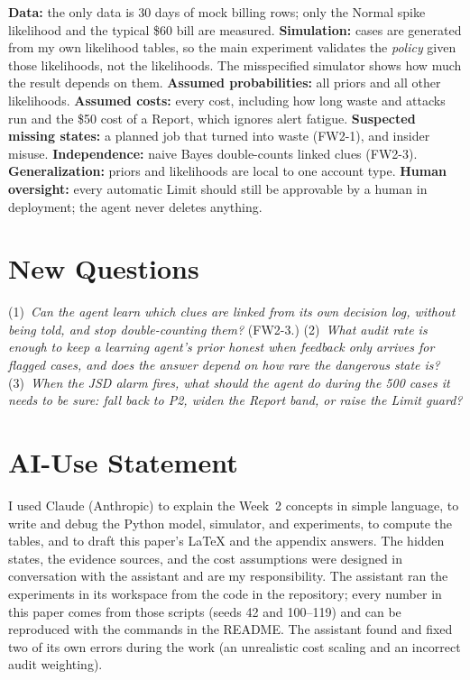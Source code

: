 \documentclass{article}
\begin{document}
\textbf{Data:} the only data is 30 days of mock billing rows; only the Normal spike likelihood and the typical \$60 bill are measured. \textbf{Simulation:} cases are generated from my own likelihood tables, so the main experiment validates the \emph{policy} given those likelihoods, not the likelihoods. The misspecified simulator shows how much the result depends on them. \textbf{Assumed probabilities:} all priors and all other likelihoods. \textbf{Assumed costs:} every cost, including how long waste and attacks run and the \$50 cost of a Report, which ignores alert fatigue. \textbf{Suspected missing states:} a planned job that turned into waste (FW2-1), and insider misuse. \textbf{Independence:} naive Bayes double-counts linked clues (FW2-3). \textbf{Generalization:} priors and likelihoods are local to one account type. \textbf{Human oversight:} every automatic Limit should still be approvable by a human in deployment; the agent never deletes anything.

\section{New Questions}

(1)~\emph{Can the agent learn which clues are linked from its own decision log, without being told, and stop double-counting them?} (FW2-3.) (2)~\emph{What audit rate is enough to keep a learning agent's prior honest when feedback only arrives for flagged cases, and does the answer depend on how rare the dangerous state is?} (3)~\emph{When the JSD alarm fires, what should the agent do during the 500 cases it needs to be sure: fall back to P2, widen the Report band, or raise the Limit guard?}

\section*{AI-Use Statement}
I used Claude (Anthropic) to explain the Week~2 concepts in simple language, to write and debug the Python model, simulator, and experiments, to compute the tables, and to draft this paper's LaTeX and the appendix answers. The hidden states, the evidence sources, and the cost assumptions were designed in conversation with the assistant and are my responsibility. The assistant ran the experiments in its workspace from the code in the repository; every number in this paper comes from those scripts (seeds 42 and 100--119) and can be reproduced with the commands in the README. The assistant found and fixed two of its own errors during the work (an unrealistic cost scaling and an incorrect audit weighting).
\end{document}
